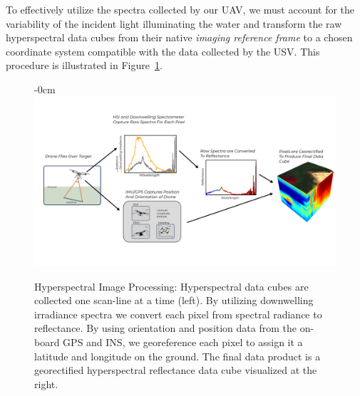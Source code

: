 \documentclass[sensors,article,submit,pdftex,moreauthors]{Definitions/mdpi}
\begin{document}
To effectively utilize the spectra collected by our UAV, we must account for the variability of the incident light illuminating the water and transform the raw hyperspectral data cubes from their native \textit{imaging reference frame} to a chosen coordinate system compatible with the data collected by the USV. This procedure is illustrated in Figure~\ref{fig:hsi-pipeline}.

\begin{figure}[H]
\begin{adjustwidth}{-\extralength}{0cm}
\centering
\includegraphics[width=14cm]{paper/figures/materials-and-methods/pipeline-figure-2.pdf}
\end{adjustwidth}
\caption{Hyperspectral Image Processing: Hyperspectral data cubes are collected one scan-line at a time (left). By utilizing downwelling irradiance spectra we convert each pixel from spectral radiance to reflectance. By using orientation and position data from the on-board GPS and INS, we georeference each pixel to assign it a latitude and longitude on the ground. The final data product is a georectified hyperspectral reflectance data cube visualized at the right. \label{fig:hsi-pipeline}}
\end{figure}  
\end{document}
